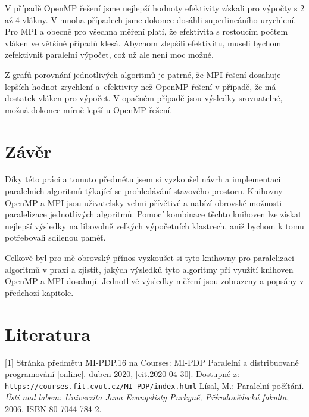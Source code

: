 \documentclass{article}
\begin{document}
V případě OpenMP řešení jsme nejlepší hodnoty efektivity získali pro výpočty s 2 až 4 vlákny. V mnoha případech jsme dokonce dosáhli superlineáního urychlení. Pro MPI a obecně pro všechna měření platí, že efektivita s rostoucím počtem vláken ve většině případů klesá. Abychom zlepšili efektivitu, museli bychom zefektivnit paralelní výpočet, což už ale není moc možné.

Z grafů porovnání jednotlivých algoritmů je patrné, že MPI řešení dosahuje lepších hodnot zrychlení a~efektivity než OpenMP řešení v případě, že má dostatek vláken pro výpočet. V opačném případě jsou výsledky srovnatelné, možná dokonce mírně lepší u OpenMP řešení.

\section{Závěr}
Díky této práci a tomuto předmětu jsem si vyzkoušel návrh a implementaci paralelních algoritmů týkající se prohledávání stavového prostoru. Knihovny OpenMP a MPI jsou uživatelsky velmi přívětivé a nabízí obrovské možnosti paralelizace jednotlivých algoritmů. Pomocí kombinace těchto knihoven lze získat nejlepší výsledky na libovolně velkých výpočetních klastrech, aniž bychom k tomu potřebovali sdílenou paměť.

Celkově byl pro mě obrovský přínos vyzkoušet si tyto knihovny pro paralelizaci algoritmů v praxi a zjistit, jakých výsledků tyto algoritmy při využití knihoven OpenMP a MPI dosahují. Jednotlivé výsledky měření jsou zobrazeny a popsány v předchozí kapitole.

\section{Literatura}

[1] Stránka předmětu MI-PDP.16 na Courses: MI-PDP Paralelní a distribuované programování [online]. duben 2020, [cit.2020-04-30]. Dostupné z: \texttt{\href{https://courses.fit.cvut.cz/MI-PDP/index.html}{https://courses.fit.cvut.cz/MI-PDP/index.html}} \newline \newline
[2] Lísal, M.: Paralelní počítání. \textit{Ústí nad labem: Univerzita Jana Evangelisty Purkyně, Přírodovědecká fakulta}, 2006. ISBN 80-7044-784-2. 
\end{document}
